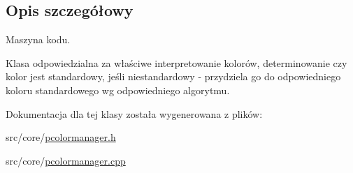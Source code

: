 \subsection{Opis szczegółowy}
Maszyna kodu. 

Klasa odpowiedzialna za właściwe interpretowanie kolorów, determinowanie czy kolor jest standardowy, jeśli niestandardowy - przydziela go do odpowiedniego koloru standardowego wg odpowiedniego algorytmu. 

Dokumentacja dla tej klasy została wygenerowana z plików:\begin{CompactItemize}
\item 
src/core/\hyperlink{pcolormanager_8h}{pcolormanager.h}\item 
src/core/\hyperlink{pcolormanager_8cpp}{pcolormanager.cpp}\end{CompactItemize}
